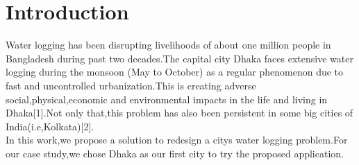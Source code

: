 \documentclass{acm_proc_article-sp}
\begin{document}
{        
}

\maketitle

\section{Introduction}

Water logging has been disrupting livelihoods of about one million people in Bangladesh during past two decades.The capital city Dhaka faces extensive water logging during the monsoon (May to October) as a regular  phenomenon due to fast and uncontrolled urbanization.This is creating adverse social,physical,economic and environmental impacts in the life and living in Dhaka[1].Not only that,this problem has also been persistent in some big cities of India(i.e,Kolkata)[2].\\In this work,we propose a solution to redesign a city\textquotesingle s water logging problem.For our case study,we chose Dhaka as our first city to try the proposed application.
\end{document}
